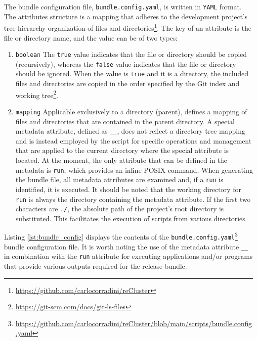 The bundle configuration file, \texttt{bundle.config.yaml}, is written in \texttt{YAML}
format. \\ %
The attributes structure is a mapping that adheres to the development project's
tree hierarchy organization of files and directories\footnote{\url{https://github.com/carlocorradini/reCluster}}.
The key of an attribute is the file or directory name, and the value can be of
two types:
\begin{enumerate}
  \item \texttt{boolean}
    \newline
    The \texttt{true} value indicates that the file or directory should be copied
    (recursively), whereas the \texttt{false} value indicates that the file or directory
    should be ignored.
    \newline
    When the value is \texttt{true} and it is a directory, the included files
    and directories are copied in the order specified by the Git index and
    working tree\footnote{\url{https://git-scm.com/docs/git-ls-files}}.

  \item \texttt{mapping}
    \newline
    Applicable exclusively to a directory (parent), defines a mapping of files and
    directories that are contained in the parent directory.
    \newline
    A special metadata attribute, defined as \texttt{\_\_}, does not reflect a
    directory tree mapping and is instead employed by the script for specific
    operations and management that are applied to the current directory where
    the special attribute is located. At the moment, the only attribute that can
    be defined in the metadata is \texttt{run}, which provides an inline POSIX
    command. When generating the bundle file, all metadata attributes are
    examined and, if a \texttt{run} is identified, it is executed. It should be
    noted that the working directory for \texttt{run} is always the directory containing
    the metadata attribute. If the first two characters are \texttt{./}, the absolute
    path of the project's root directory is substituted. This facilitates the
    execution of scripts from various directories.
\end{enumerate}
Listing \ref{lst:bundle_config} displays the contents of the \texttt{bundle.config.yaml}\footnote{\url{https://github.com/carlocorradini/reCluster/blob/main/scripts/bundle.config.yaml}}
bundle configuration file. It is worth noting the use of the metadata attribute \texttt{\_\_}
in combination with the \texttt{run} attribute for executing applications and/or
programs that provide various outputs required for the release bundle.


